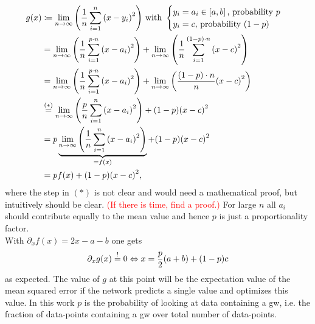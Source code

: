\begin{align}
g(x) & \coloneqq\lim_{n\to\infty}{\left( \frac{1}{n}\sum_{i=1}^{n}{\left( x-y_i \right)}^2 \right)}\text{ with }
\begin{cases}
	y_i=a_i\in\left[a,b\right]\text{, probability }p\\
	y_i=c\text{, probability }(1-p)
\end{cases}\nonumber\\
& = \lim_{n\to\infty}{\left( \frac{1}{n}\sum_{i=1}^{p\cdot n}{\left( x-a_i \right)}^2 \right)}+\lim_{n\to\infty}{\left( \frac{1}{n}\sum_{i=1}^{(1-p)\cdot n}{\left( x-c \right)}^2 \right)}\nonumber\\
& = \lim_{n\to\infty}{\left( \frac{1}{n}\sum_{i=1}^{p\cdot n}{\left( x-a_i \right)}^2 \right)}+\lim_{n\to\infty}{\left( \frac{(1-p)\cdot n}{n}{\left( x-c \right)}^2 \right)}\nonumber\\
& \overset{(\ast)}{=} \lim_{n\to\infty}{\left( \frac{p}{n}\sum_{i=1}^{n}{\left( x-a_i \right)}^2 \right)}+(1-p){\left( x-c \right)}^2\nonumber\\
& = p\underbrace{\lim_{n\to\infty}{\left( \frac{1}{n}\sum_{i=1}^{n}{\left( x-a_i \right)}^2 \right)}}_{=f(x)}+(1-p){\left( x-c \right)}^2\nonumber\\
& = p f(x) + (1-p){\left( x-c \right)}^2,
\end{align}
where the step in $(\ast)$ is not clear and would need a mathematical proof, but intuitively should be clear. \textcolor{red}{(If there is time, find a proof.)} For large $n$ all $a_i$ should contribute equally to the mean value and hence $p$ is just a proportionality factor.\\
With $\partial_x f(x)=2x-a-b$ one gets
\begin{equation}
\partial_x g(x) \overset{!}{=} 0 \Leftrightarrow x = \frac{p}{2}{\left( a+b \right)}+{\left( 1-p \right)}c
\end{equation}
as expected. The value of $g$ at this point will be the expectation value of the mean squared error if the network predicts a single value and optimizes this value. In this work $p$ is the probability of looking at data containing a \gls{gw}, i.e. the fraction of data-points containing a \gls{gw} over total number of data-points.

